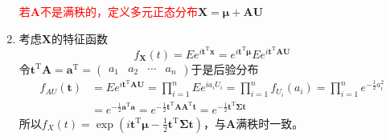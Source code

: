 \begin{enumerate}[label = \arabic*\textsuperscript{$\circ$}]
    \textcolor{red}{若$\boldsymbol{A}$不是满秩的，定义多元正态分布}$\boldsymbol{X} = \boldsymbol{\mu}+\boldsymbol{AU}$
    \item 考虑$\boldsymbol{X}$的特征函数
    \[
        f_{\boldsymbol{X}}(t) = Ee^{i\boldsymbol{t}^{\mathrm{T}}\boldsymbol{x}}=e^{i\boldsymbol{t}^{\mathrm{T}}\boldsymbol{\mu}}Ee^{i\boldsymbol{t}^{\mathrm{T}}\boldsymbol{AU}}
    \]
    令$\boldsymbol{t}^{\mathrm{T}}\boldsymbol{A} = \boldsymbol{a}^{\mathrm{T}} = \begin{pmatrix}
        a_1& a_2&\cdots&a_n
    \end{pmatrix}$于是后验分布
    \[
        \begin{array}{ll}
            f_{AU}(\boldsymbol{t})&=Ee^{i\boldsymbol{t}^{\mathrm{T}}\boldsymbol{AU}}=\prod\limits_{i = 1}^{n}Ee^{ia_iU_i}=\prod\limits_{i = 1}^{n}f_{U_i}(a_i)=\prod\limits_{i = 1}^{n}e^{-\frac{1}{2}a_{i}^2}\\
            &=e^{-\frac{1}{2}\boldsymbol{a}^{\mathrm{T}}\boldsymbol{a}}=e^{-\frac{1}{2}\boldsymbol{t}^\mathrm{T}\boldsymbol{A}\boldsymbol{A}^\mathrm{T}\boldsymbol{t}}=e^{-\frac{1}{2}\boldsymbol{t}^{\mathrm{T}}\boldsymbol{\Sigma}\boldsymbol{t}}
        \end{array}
    \]
    所以$f_X(t)=\exp(i\boldsymbol{t}^{\mathrm{T}}\boldsymbol{\mu}-\frac{1}{2}\boldsymbol{t}^\mathrm{T}\boldsymbol{\Sigma}\boldsymbol{t})$，与$\boldsymbol{A}$满秩时一致。
\end{enumerate}

